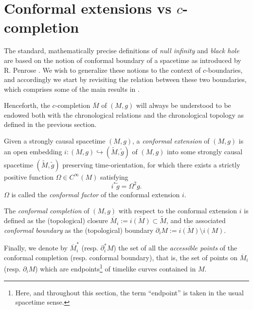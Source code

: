 \section{Conformal extensions vs $c$-completion}
\label{conf}

The standard, mathematically precise definitions of {\em null infinity} and {\em black hole} are based on the notion of  conformal boundary of a spacetime as introduced by R. Penrose \cite{PenroseAsymptoticStructure1963,PenroseConformalInfinity1964}. We wish to generalize these notions to the context of $c$-boundaries, and accordingly we start by revisiting the relation between these two boundaries, which comprises some of the main results in \cite[Section 4]{Floresfinaldefinitioncausal2011}.

Henceforth, the $c$-completion $\overline{M}$ of $(M,g)$ will always be understood to be endowed both with the chronological relations and the chronological topology as defined in the previous section.


%

\begin{definition}\label{def:envelopment}
  Given a strongly causal spacetime $(M,g)$, a {\em conformal extension} of $(M,g)$ is an open embedding $i:(M,g) \hookrightarrow (\tilde{M},\tilde{g})$ of $(M,g)$ into some strongly causal spacetime $(\tilde{M},\tilde{g})$ preserving time-orientation, for which there exists a strictly positive function $\Omega\in C^{\infty}(M)$ satisfying
    \begin{equation}
\label{conformalfactor1}
i^{*}\tilde{g}=\Omega^2 g.
\end{equation}
$\Omega$ is called the {\em conformal factor} of the conformal extension $i$.

The {\em conformal completion} of $(M,g)$ with respect to the conformal extension $i$ is defined as the (topological) closure $\overline{M}_i:=\overline{i(M)}\subset \tilde{M}$, and the associated {\em conformal boundary} as the (topological) boundary $\partial_i M:=\overline{i(M)}\setminus i(M)$.

Finally, we denote by $\overline{M}_i^*$ (resp. $\partial_i^* M$) the set of all the {\em accessible points} of the conformal completion (resp. conformal boundary), that is, the set of points on $\overline{M}_i$ (resp. $\partial_i M$) which are endpoints\footnote{Here, and throughout this section, the term ``endpoint'' is taken in the usual spacetime sense.} of timelike curves contained in $M$.
\end{definition}

